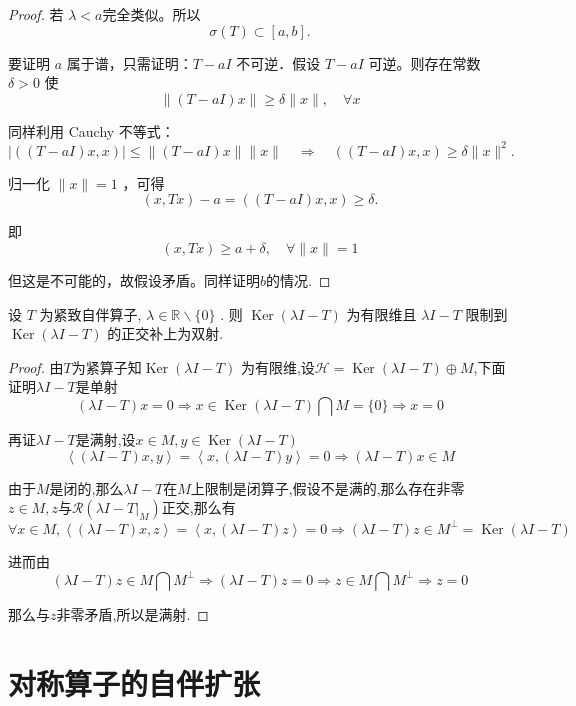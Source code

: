 \documentclass[lang=cn,newtx,10pt,scheme=chinese,thmcnt=chapter]{elegantbook}
\newcommand{\Ker}{\operatorname{Ker}}
\begin{document}
\begin{problemset}
\begin{proof}
若 $\lambda<a$完全类似。所以
$$
\sigma(T) \subset[a, b] .
$$

要证明 $a$ 属于谱，只需证明：$T-a I$ 不可逆．假设 $T-a I$ 可逆。则存在常数 $\delta>0$ 使
$$
\|(T-a I) x\| \geq \delta\|x\|, \quad \forall x
$$

同样利用 Cauchy 不等式：
$$
|((T-a I) x, x)| \leq\|(T-a I) x\|\|x\| \quad \Rightarrow \quad((T-a I) x, x) \geq \delta\|x\|^2 .
$$

归一化 $\|x\|=1$ ，可得
$$
(x, T x)-a=((T-a I) x, x) \geq \delta .
$$

即
$$
(x, T x) \geq a+\delta, \quad \forall\|x\|=1
$$

但这是不可能的，故假设矛盾。同样证明$b$的情况.
\end{proof}
\item 设 \(T\) 为紧致自伴算子, \(\lambda  \in  \mathbb{R} \smallsetminus  \{ 0\}\) . 则 \(\operatorname{Ker}\left( {{\lambda I} - T}\right)\) 为有限维且 \({\lambda I} - T\) 限制到 \(\operatorname{Ker}\left( {{\lambda I} - T}\right)\) 的正交补上为双射.
\end{problemset}
\begin{proof}
    由$T$为紧算子知\(\operatorname{Ker}\left( {{\lambda I} - T}\right)\) 为有限维,设$\mathcal{H}=\operatorname{Ker}\left( {{\lambda I} - T}\right)\oplus M$,下面证明$\lambda I-T$是单射\[
    (\lambda I-T)x=0\Rightarrow x\in \Ker(\lambda I-T)\bigcap M=\{0\}\Rightarrow x=0 
    \]
    
    再证$\lambda I-T$是满射,设$x\in M,y\in \Ker(\lambda I-T)$\[
    \left\langle (\lambda I-T)x,y\right\rangle=  \left\langle x,(\lambda I-T)y\right\rangle =0\Rightarrow  (\lambda I-T)x\in M
    \]
  
    由于$M$是闭的,那么$ \lambda I-T$在$M$上限制是闭算子,假设不是满的,那么存在非零$z\in M,z$与$\mathcal{R} (\lambda I-T|_M)$正交,那么有\[
      \forall  x\in M, \left\langle (\lambda I-T)x,z\right\rangle=  \left\langle x,(\lambda I-T)z\right\rangle =0\Rightarrow  (\lambda I-T)z\in M^\perp=\Ker(\lambda I-T)
    \]
    
    进而由\[(\lambda I-T)z\in M\bigcap M^\perp\Rightarrow (\lambda I-T)z=0\Rightarrow z\in M\bigcap M^\perp \Rightarrow z=0 \]
    
    那么与$z$非零矛盾,所以是满射.
\end{proof}

\section{对称算子的自伴扩张}
\end{document}

